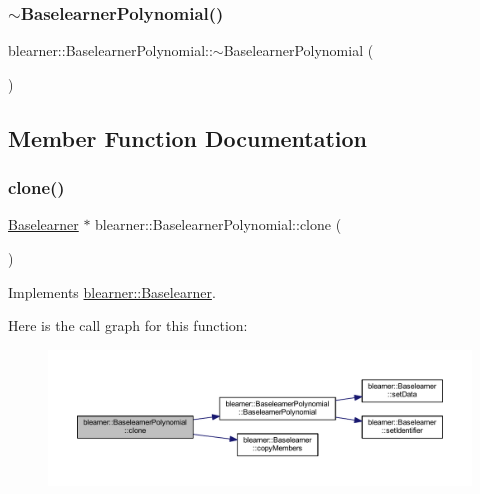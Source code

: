 \subsubsection{\texorpdfstring{$\sim$\+Baselearner\+Polynomial()}{~BaselearnerPolynomial()}}
{\footnotesize\ttfamily blearner\+::\+Baselearner\+Polynomial\+::$\sim$\+Baselearner\+Polynomial (\begin{DoxyParamCaption}{ }\end{DoxyParamCaption})}



\subsection{Member Function Documentation}
\mbox{\label{classblearner_1_1_baselearner_polynomial_a4afd811448bd6d387b721cc48b84da26}} 
\subsubsection{\texorpdfstring{clone()}{clone()}}
{\footnotesize\ttfamily \hyperlink{classblearner_1_1_baselearner}{Baselearner} $\ast$ blearner\+::\+Baselearner\+Polynomial\+::clone (\begin{DoxyParamCaption}{ }\end{DoxyParamCaption})\hspace{0.3cm}{\ttfamily [virtual]}}



Implements \hyperlink{classblearner_1_1_baselearner_a8e12c6739f085917a7d2da6570c51a21}{blearner\+::\+Baselearner}.

Here is the call graph for this function\+:\nopagebreak
\begin{figure}[H]
\begin{center}
\leavevmode
\includegraphics[width=350pt]{classblearner_1_1_baselearner_polynomial_a4afd811448bd6d387b721cc48b84da26_cgraph}
\end{center}
\end{figure}
\mbox{\label{classblearner_1_1_baselearner_polynomial_aacd6ba3b09ccf63a96d7bffa1d703710}} 
